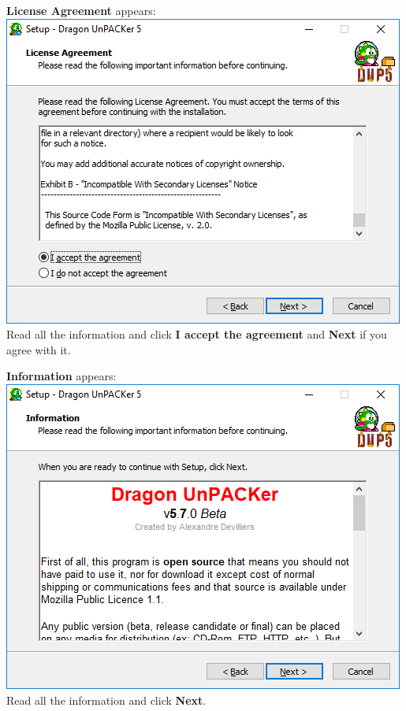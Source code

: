 \documentclass[10pt,a4paper,twoside]{book}
\makeatletter
\def\maxwidth#1{\ifdim\Gin@nat@width>#1 #1\else\Gin@nat@width\fi}
\makeatother
\begin{document}
\begin{enumerate}
\begin{minipage}{\linewidth}
\item \textbf{License Agreement} appears: \\
\includegraphics[width=\maxwidth{9cm}]{install/003-license}\\
 Read all the information and click \textbf{I accept the agreement} and \textbf{Next} if you agree with it.\\
\end{minipage}

\begin{minipage}{\linewidth}
\item \textbf{Information} appears: \\
\includegraphics[width=\maxwidth{9cm}]{install/004-information}\\
 Read all the information and click \textbf{Next}.\\
\end{minipage}


\end{enumerate}
\end{document}

